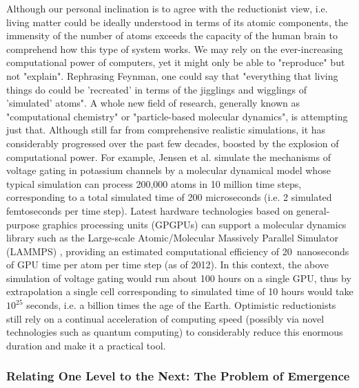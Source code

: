   Although our personal inclination is to agree with the reductionist view, i.e. living matter could be ideally understood in terms of its atomic components, the immensity of the number of atoms exceeds the capacity of the human brain to comprehend how this type of system works. We may rely on the ever-increasing computational power of computers, yet it might only be able to "reproduce" but not "explain". Rephrasing Feynman, one could say that "everything that living things do could be 'recreated' in terms of the jigglings and wigglings of 'simulated' atoms". A whole new field of research, generally known as "computational chemistry" or "particle-based molecular dynamics", is attempting just that. Although still far from comprehensive realistic simulations, it has considerably progressed over the past few decades, boosted by the explosion of computational power. For example, Jensen et al. \cite{Jensen:2012ee} simulate the mechanisms of voltage gating in potassium channels by a molecular dynamical model whose typical simulation can process 200,000 atoms in 10 million time steps, corresponding to a total simulated time of 200 microseconds (i.e. 2 simulated femtoseconds per time step). Latest hardware technologies based on general-purpose graphics processing units (GPGPUs) can support a molecular dynamics library such as the Large-scale Atomic/Molecular Massively Parallel Simulator (LAMMPS) \cite{Plimpton:1995wl}, providing an estimated computational efficiency of 20 nanoseconds of GPU time per atom per time step (as of 2012). In this context, the above simulation of voltage gating would run about 100 hours on a single GPU, thus by extrapolation a single cell corresponding to simulated time of 10 hours would take $10^{25}$ seconds, i.e. a billion times the age of the Earth. Optimistic reductionists still rely on a continual acceleration of computing speed (possibly via novel technologies such as quantum computing) to considerably reduce this enormous duration and make it a practical tool. 

\subsubsection{Relating One Level to the Next: The Problem of Emergence}  

